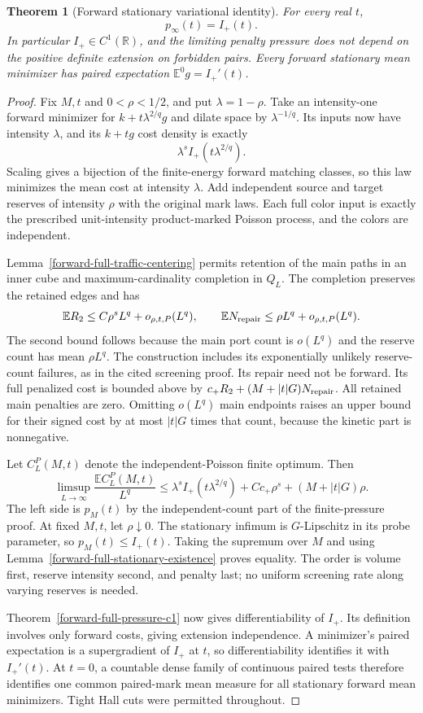 \documentclass[11pt,reqno]{amsart}
\newtheorem{theorem}{Theorem}[section]
\theoremstyle{definition}
\theoremstyle{remark}
\numberwithin{equation}{section}
\newcommand{\R}{\mathbb R}
\newcommand{\E}{\mathbb E}
\begin{document}
\begin{theorem}[Forward stationary variational identity]
\label{forward-full-stationary-identity}
For every real \(t\),
\[
                         p_\infty(t)=I_+(t).
\]
In particular \(I_+\in C^1(\R)\), and the limiting penalty pressure
does not depend on the positive definite extension on forbidden pairs.
Every forward stationary mean minimizer has paired expectation
\(\E^0g=I_+'(t)\).
\end{theorem}
\begin{proof}
Fix \(M,t\) and \(0<\rho<1/2\), and put \(\lambda=1-\rho\).
Take an intensity-one forward minimizer for
\(k+t\lambda^{2/q}g\) and dilate space by \(\lambda^{-1/q}\).
Its inputs now have intensity \(\lambda\), and its \(k+t g\) cost
density is exactly
\[
                  \lambda^s I_+(t\lambda^{2/q}).
\]
Scaling gives a bijection of the finite-energy forward matching classes,
so this law minimizes the mean cost at intensity \(\lambda\).
Add independent source and target reserves of intensity \(\rho\) with
the original mark laws. Each full color input is exactly the prescribed
unit-intensity product-marked Poisson process, and the colors are
independent.

Lemma~\ref{forward-full-traffic-centering} permits retention of the main
paths in an inner cube and maximum-cardinality completion in \(Q_L\).
The completion preserves the retained edges and has
\[
 \E R_2\le C\rho^sL^q+o_{\rho,t,P}(L^q),\qquad
 \E N_{\rm repair}\le\rho L^q+o_{\rho,t,P}(L^q).
\]
The second bound follows because the main port count is \(o(L^q)\)
and the reserve count has mean \(\rho L^q\). The construction includes
its exponentially unlikely reserve-count failures, as in the cited
screening proof. Its repair need not be forward. Its full penalized cost
is bounded above by \(c_+R_2+(M+|t|G)N_{\rm repair}\).
All retained main penalties are zero. Omitting \(o(L^q)\) main endpoints
raises an upper bound for their signed cost by at most \(|t|G\) times
that count, because the kinetic part is nonnegative.

Let \(C_L^P(M,t)\) denote the independent-Poisson finite optimum. Then
\[
 \limsup_{L\to\infty}\frac{\E C_L^P(M,t)}{L^q}
 \le\lambda^s I_+(t\lambda^{2/q})
             +C c_+\rho^s+(M+|t|G)\rho.
\]
The left side is \(p_M(t)\) by the independent-count part of the
finite-pressure proof. At fixed \(M,t\), let \(\rho\downarrow0\).
The stationary infimum is \(G\)-Lipschitz in its probe parameter,
so \(p_M(t)\le I_+(t)\). Taking the supremum over \(M\) and using
Lemma~\ref{forward-full-stationary-existence} proves equality.
The order is volume first, reserve intensity second, and penalty last;
no uniform screening rate along varying reserves is needed.

Theorem~\ref{forward-full-pressure-c1} now gives differentiability of
\(I_+\). Its definition involves only forward costs, giving extension
independence. A minimizer's paired expectation is a supergradient of
\(I_+\) at \(t\), so differentiability identifies it with \(I_+'(t)\).
At \(t=0\), a countable dense family of continuous paired tests therefore
identifies one common paired-mark mean measure for all stationary forward
mean minimizers. Tight Hall cuts were permitted throughout.
\end{proof}
\end{document}
